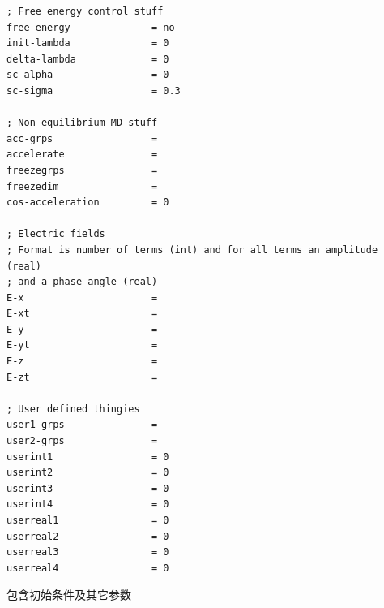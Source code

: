 \documentclass[12pt, a4paper, oneside]{ctexart}
\begin{document}
\begin{spacing}{2.0}
\begin{lstlisting}[caption={94k.mdp}]
; Free energy control stuff
free-energy              = no
init-lambda              = 0
delta-lambda             = 0
sc-alpha                 = 0
sc-sigma                 = 0.3

; Non-equilibrium MD stuff
acc-grps                 = 
accelerate               = 
freezegrps               = 
freezedim                = 
cos-acceleration         = 0

; Electric fields      
; Format is number of terms (int) and for all terms an amplitude (real)
; and a phase angle (real)
E-x                      = 
E-xt                     = 
E-y                      = 
E-yt                     = 
E-z                      = 
E-zt                     = 

; User defined thingies
user1-grps               = 
user2-grps               = 
userint1                 = 0
userint2                 = 0
userint3                 = 0
userint4                 = 0
userreal1                = 0
userreal2                = 0
userreal3                = 0
userreal4                = 0
\end{lstlisting}
包含初始条件及其它参数

\end{spacing}
\end{document}
